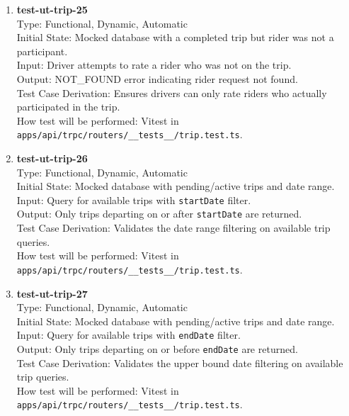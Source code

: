 \documentclass[12pt, titlepage]{article}
\begin{document}
\begin{enumerate}
\item \textbf{test-ut-trip-25}\\
Type: Functional, Dynamic, Automatic\\
Initial State: Mocked database with a completed trip but rider was not a participant.\\
Input: Driver attempts to rate a rider who was not on the trip.\\
Output: NOT\_FOUND error indicating rider request not found.\\
Test Case Derivation: Ensures drivers can only rate riders who actually participated in the trip.\\
How test will be performed: Vitest in \texttt{apps/api/trpc/routers/\_\_tests\_\_/trip.test.ts}.\\

\item \textbf{test-ut-trip-26}\\
Type: Functional, Dynamic, Automatic\\
Initial State: Mocked database with pending/active trips and date range.\\
Input: Query for available trips with \texttt{startDate} filter.\\
Output: Only trips departing on or after \texttt{startDate} are returned.\\
Test Case Derivation: Validates the date range filtering on available trip queries.\\
How test will be performed: Vitest in \texttt{apps/api/trpc/routers/\_\_tests\_\_/trip.test.ts}.\\

\item \textbf{test-ut-trip-27}\\
Type: Functional, Dynamic, Automatic\\
Initial State: Mocked database with pending/active trips and date range.\\
Input: Query for available trips with \texttt{endDate} filter.\\
Output: Only trips departing on or before \texttt{endDate} are returned.\\
Test Case Derivation: Validates the upper bound date filtering on available trip queries.\\
How test will be performed: Vitest in \texttt{apps/api/trpc/routers/\_\_tests\_\_/trip.test.ts}.\\


\end{enumerate}
\end{document}
